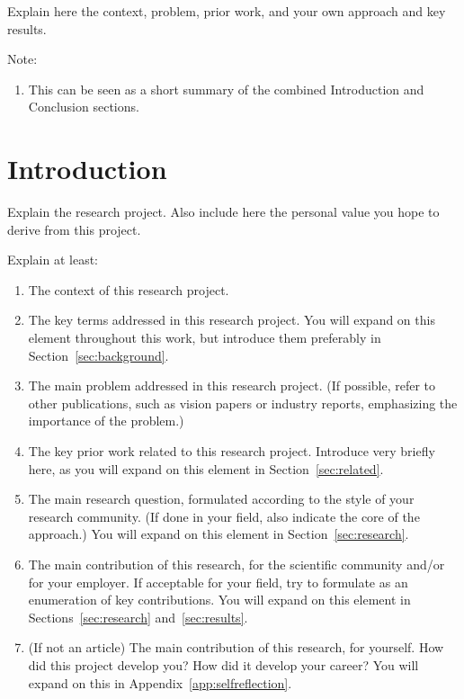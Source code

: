 \documentclass[11pt]{article}
\begin{document}
Explain here the context, problem, prior work, and your own approach and key results. 

Note:
\begin{enumerate}
    \item This can be seen as a short summary of the combined Introduction and Conclusion sections.
\end{enumerate}



\section{Introduction} \label{sec:introduction}

Explain the research project. Also include here the personal value you hope to derive from this project.

Explain at least:
\begin{enumerate}
    \item The context of this research project. 
    
    \item The key terms addressed in this research project. You will expand on this element throughout this work, but introduce them preferably in Section~\ref{sec:background}.
    
    \item The main problem addressed in this research project. (If possible, refer to other publications, such as vision papers or industry reports, emphasizing the importance of the problem.) 
    
    \item The key prior work related to this research project. Introduce very briefly here, as you will expand on this element in Section~\ref{sec:related}.
    
    \item The main research question, formulated according to the style of your research community. (If done in your field, also indicate the core of the approach.) You will expand on this element in Section~\ref{sec:research}.
    
    \item The main contribution of this research, for the scientific community and/or for your employer. If acceptable for your field, try to formulate as an enumeration of key contributions. You will expand on this element in Sections~\ref{sec:research} and~\ref{sec:results}.
    
    \item (If not an article) The main contribution of this research, for yourself. How did this project develop you? How did it develop your career? You will expand on this in Appendix~\ref{app:selfreflection}.
    
\end{enumerate}
\end{document}
